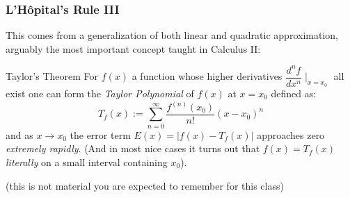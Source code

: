 \documentclass{ltx-talk}
\begin{document}
\begin{frame}
  \frametitle{L'Hôpital's Rule III}

  This comes from a generalization of both linear and quadratic approximation,
  arguably the most important concept taught in Calculus II:

  \begin{alertblock}{Taylor's Theorem}
    For $f(x)$ a function whose higher derivatives $\dfrac{d^n f}{dx^n} \mid_{x = x_0}$ all exist one can form the \textit{Taylor Polynomial} of $f(x)$ at $x = x_0$ defined as:
    \begin{equation}
      T_f(x) := \sum\limits_{n = 0}^{\infty} \dfrac{f^{(n)}(x_0)}{n!} (x - x_0)^n
    \end{equation}
  and as $x \rightarrow x_0$ the error term $E(x) = |f(x) - T_f(x)|$
  approaches zero \textit{extremely rapidly}. (And in most nice cases it turns out that $f(x) = T_f(x)$ \textit{literally} on a small interval containing $x_0$).
  \end{alertblock}

  (this is not material you are expected to remember for this class)
\end{frame}
\end{document}
